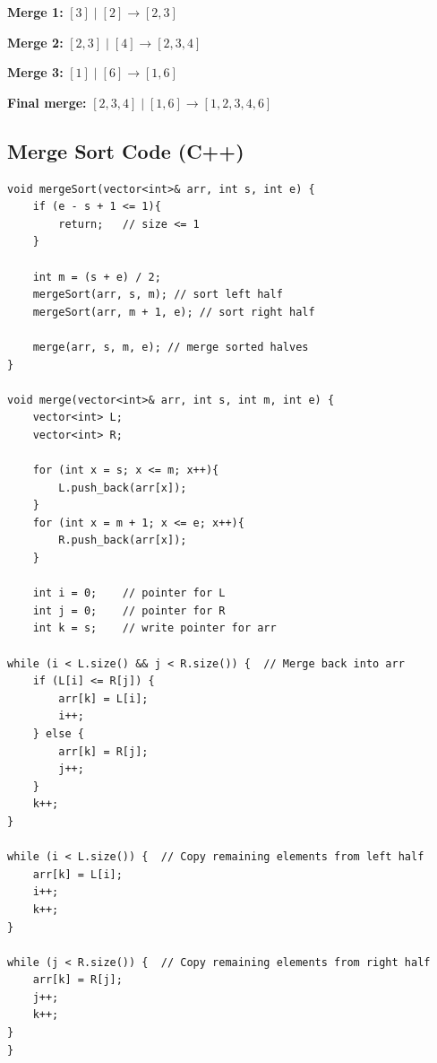 \documentclass{article}
\begin{document}

\textbf{Merge 1:} \([3] \mid [2] \rightarrow [2,3]\)


\vspace{0.2cm}

\textbf{Merge 2:} \([2,3] \mid [4] \rightarrow [2,3,4]\)


\vspace{0.2cm}

\newpage
\textbf{Merge 3:} \([1] \mid [6] \rightarrow [1,6]\) 

\textbf{Final merge:} \([2,3,4] \mid [1,6] \rightarrow [1,2,3,4,6]\)


\newpage
\subsection{Merge Sort Code (C++)}
\begin{verbatim}
void mergeSort(vector<int>& arr, int s, int e) {
    if (e - s + 1 <= 1){
        return;   // size <= 1
    }
    
    int m = (s + e) / 2;
    mergeSort(arr, s, m); // sort left half
    mergeSort(arr, m + 1, e); // sort right half
    
    merge(arr, s, m, e); // merge sorted halves
}

void merge(vector<int>& arr, int s, int m, int e) {
    vector<int> L;
    vector<int> R;

    for (int x = s; x <= m; x++){
        L.push_back(arr[x]);
    }
    for (int x = m + 1; x <= e; x++){
        R.push_back(arr[x]);
    }
    
    int i = 0;    // pointer for L
    int j = 0;    // pointer for R
    int k = s;    // write pointer for arr

while (i < L.size() && j < R.size()) {  // Merge back into arr
    if (L[i] <= R[j]) {
        arr[k] = L[i];
        i++;
    } else {
        arr[k] = R[j];
        j++;
    }
    k++;
}

while (i < L.size()) {  // Copy remaining elements from left half
    arr[k] = L[i];
    i++;
    k++;
}

while (j < R.size()) {  // Copy remaining elements from right half
    arr[k] = R[j];
    j++;
    k++;
}
}
\end{verbatim}
\end{document}
